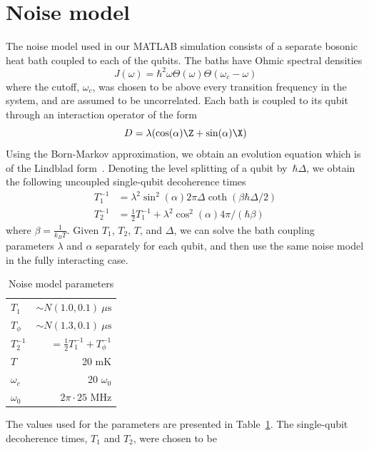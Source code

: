 \documentclass[11pt,oneside,final]{huthesis}%
\begin{document}
\section{Noise model}\label{supp-inf:noise}

The noise model used in our MATLAB simulation consists of
a separate bosonic heat bath coupled to each of the qubits.
The baths have Ohmic spectral densities
\begin{equation}
J(\omega) = \hbar^2 \omega \Theta(\omega) \Theta(\omega_c-\omega)
\end{equation}
where the cutoff, $\omega_c$, was chosen to be above every transition
frequency in
the system, and are assumed to be uncorrelated.
Each bath is coupled to its qubit through an interaction operator of the
form
\begin{equation}
D = \lambda (\cos(\alpha)\Z +\sin(\alpha)\X)
\end{equation}
Using the Born-Markov approximation, we obtain an
evolution equation which is of the Lindblad form~\cite{Breuer02}.
Denoting the level splitting of a qubit by~$\hbar \Delta$,
we obtain the following uncoupled single-qubit decoherence times
\begin{align}
T_{1}^{-1} &= \lambda^2 \sin^2(\alpha)
2 \pi \Delta \coth(\beta \hbar \Delta/2)\\
T_{2}^{-1} &= \frac{1}{2} T_{1}^{-1} +\lambda^2 \cos^2(\alpha) 4 \pi / (\hbar
\beta)
\end{align}
where $\beta = \frac{1}{k_B T}$.
Given $T_1$, $T_2$, $T$, and $\Delta$, we can solve the bath coupling
parameters $\lambda$ and $\alpha$ separately for each qubit, and then use
the same noise model in the fully interacting case.
\begin{table}
\caption{Noise model parameters}
\centering
\begin{tabular}{lr}
\hline \hline
$T_1$ & $\sim N(1.0, 0.1)~\mu \text{s}$\\
$T_\phi$ & $\sim N(1.3, 0.1)~\mu \text{s}$\\
$T_2^{-1}$ & $= \frac{1}{2}T_1^{-1} +T_\phi^{-1}$\\
$T$ & 20 mK\\
$\omega_c$ & 20 $\omega_0$\\
$\omega_0$ & $2\pi \cdot 25$ MHz\\
\hline
\end{tabular}
\label{table:par}
\end{table}
The values used for the parameters are presented in Table~\ref{table:par}.
The single-qubit decoherence times, $T_1$ and $T_2$, were chosen to be
\end{document}
